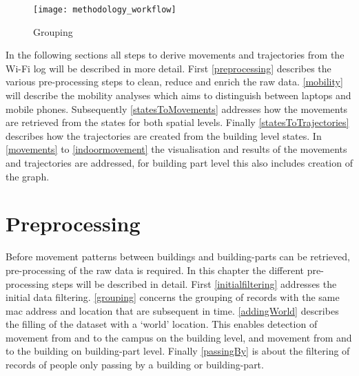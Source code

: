 \begin{figure}[H]
\centering
\texttt{[image: methodology\_workflow]}
\captionsetup{justification=centering}
\caption{Grouping}
\label{figure:workflow}
\end{figure}
In the following sections all steps to derive movements and trajectories from the Wi-Fi log will be described in more detail. First \autoref{preprocessing} describes the various pre-processing steps to clean, reduce and enrich the raw data. \autoref{mobility} will describe the mobility analyses which aims to distinguish between laptops and mobile phones. Subsequently \autoref{statesToMovements} addresses how the movements are retrieved from the states for both spatial levels. Finally \autoref{statesToTrajectories} describes how the trajectories are created from the building level states. In \autoref{movements} to \autoref{indoormovement} the visualisation and results of the movements and trajectories are addressed, for building part level this also includes creation of the graph. 

\section{Preprocessing}\label{preprocessing}
Before movement patterns between buildings and building-parts can be retrieved, pre-processing of the raw data is required. In this chapter the different pre-processing steps will be described in detail. First \autoref{initialfiltering} addresses the initial data filtering. \autoref{grouping} concerns the grouping of records with the same mac address and location that are subsequent in time. \autoref{addingWorld} describes the filling of the dataset with a ‘world’ location. This enables detection of movement from and to the campus on the building level, and movement from and to the building on building-part level. Finally \autoref{passingBy} is about the filtering of records of people only passing by a building or building-part.

